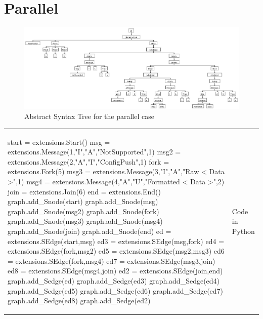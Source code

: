\documentclass[a4paper,11pt,twoside]{report}
\begin{document}
\section{Parallel}
\begin{figure}[h]
\begin{center}
\includegraphics[width=18cm]{parallelAST}\caption{Abstract Syntax Tree for the parallel case}
\end{center}
\label{fig:ParallelAST}
\end{figure}
\begin{tabular}{ll}
\begin{SJLISTING}
start = extensions.Start()
msg = extensions.Message(1,"I","A","NotSupported",1)
msg2 = extensions.Message(2,"A","I","ConfigPush",1)
fork = extensions.Fork(5)
msg3 = extensions.Message(3,"I","A","Raw < Data >",1)
msg4 = extensions.Message(4,"A","U","Formatted < Data >",2)
join = extensions.Join(6)
end = extensions.End()
graph.add_Snode(start)
graph.add_Snode(msg)
graph.add_Snode(msg2)
graph.add_Snode(fork)
graph.add_Snode(msg3)
graph.add_Snode(msg4)
graph.add_Snode(join)
graph.add_Snode(end)
ed = extensions.SEdge(start,msg)
ed3 = extensions.SEdge(msg,fork)
ed4 = extensions.SEdge(fork,msg2)
ed5 = extensions.SEdge(msg2,msg3)
ed6 = extensions.SEdge(fork,msg4)
ed7 = extensions.SEdge(msg3,join)
ed8 = extensions.SEdge(msg4,join)
ed2 = extensions.SEdge(join,end)
graph.add_Sedge(ed)
graph.add_Sedge(ed3)
graph.add_Sedge(ed4)
graph.add_Sedge(ed5)
graph.add_Sedge(ed6)
graph.add_Sedge(ed7)
graph.add_Sedge(ed8)
graph.add_Sedge(ed2)
\end{SJLISTING}
&  Code in Python
\end{tabular}
\end{document}
